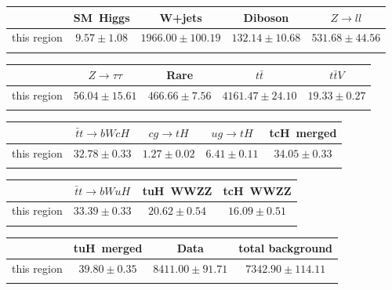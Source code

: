 \centering
\begin{tabular}{ccccc} \toprule\toprule
 & SM~Higgs & W+jets & Diboson & $Z\to ll$\\\midrule
this region & $9.57\pm1.08$ & $1966.00\pm100.19$ & $132.14\pm10.68$ & $531.68\pm44.56$\\
\bottomrule\bottomrule\\
\end{tabular}
\begin{tabular}{ccccc} \toprule\toprule
 & $Z\to \tau\tau$ & Rare & $t\bar{t}$ & $t\bar{t}V$\\\midrule
this region & $56.04\pm15.61$ & $466.66\pm7.56$ & $4161.47\pm24.10$ & $19.33\pm0.27$\\
\bottomrule\bottomrule\\
\end{tabular}
\begin{tabular}{ccccc} \toprule\toprule
 & $\bar{t}t\to bWcH$ & $cg\to tH$ & $ug\to tH$ & tcH~merged\\\midrule
this region & $32.78\pm0.33$ & $1.27\pm0.02$ & $6.41\pm0.11$ & $34.05\pm0.33$\\
\bottomrule\bottomrule\\
\end{tabular}
\begin{tabular}{cccc} \toprule\toprule
 & $\bar{t}t\to bWuH$ & tuH~WWZZ & tcH~WWZZ\\\midrule
this region & $33.39\pm0.33$ & $20.62\pm0.54$ & $16.09\pm0.51$\\
\bottomrule\bottomrule\\
\end{tabular}
\begin{tabular}{cccc} \toprule\toprule
 & tuH~merged & Data & total background\\\midrule
this region & $39.80\pm0.35$ & $8411.00\pm91.71$ & $7342.90\pm114.11$\\
\bottomrule\bottomrule\\
\end{tabular}
